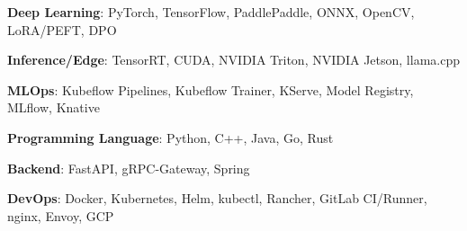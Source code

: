 %
%
%
\resumeSubHeadingListStart
  \small
  \item{\textbf{Deep Learning}{: PyTorch, TensorFlow, PaddlePaddle, ONNX, OpenCV, LoRA/PEFT, DPO}}
  \vspace{-10pt}
  \item{\textbf{Inference/Edge}{: TensorRT, CUDA, NVIDIA Triton, NVIDIA Jetson, llama.cpp}}
  \vspace{-10pt}
  \item{\textbf{MLOps}{: Kubeflow Pipelines, Kubeflow Trainer, KServe, Model Registry, MLflow, Knative}}
  \vspace{-10pt}
  \item{\textbf{Programming Language}{: Python, C++, Java, Go, Rust}}
  \vspace{-10pt}
  \item{\textbf{Backend}{: FastAPI, gRPC-Gateway, Spring}}
  \vspace{-10pt}
  \item{\textbf{DevOps}{: Docker, Kubernetes, Helm, kubectl, Rancher, GitLab CI/Runner, nginx, Envoy, GCP}}
  \vspace{-10pt}
